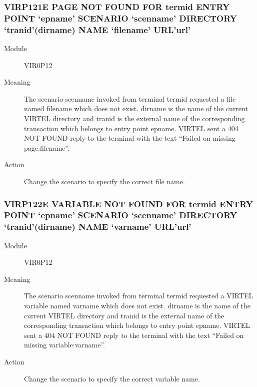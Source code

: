 \documentclass[letterpaper,10pt,english]{sphinxmanual}
\begin{document}
\subsubsection{VIRP121E PAGE NOT FOUND FOR termid ENTRY POINT ‘epname’ SCENARIO ‘scenname’ DIRECTORY ‘tranid’(dirname) NAME ‘filename’ URL’url’}
\label{\detokenize{messages:virp121e-page-not-found-for-termid-entry-point-epname-scenario-scenname-directory-tranid-dirname-name-filename-url-url}}\begin{description}
\item[{Module}] \leavevmode
VIR0P12

\item[{Meaning}] \leavevmode
The scenario scenname invoked from terminal termid requested a file named filename which does not exist. dirname is the name of the current VIRTEL directory and tranid is the external name of the corresponding transaction which belongs to entry point epname. VIRTEL sent a 404 NOT FOUND reply to the terminal with the text “Failed on missing page:filename”.

\item[{Action}] \leavevmode
Change the scenario to specify the correct file name.

\end{description}


\subsubsection{VIRP122E VARIABLE NOT FOUND FOR termid ENTRY POINT ‘epname’ SCENARIO ‘scenname’ DIRECTORY ‘tranid’(dirname) NAME ‘varname’ URL’url’}
\label{\detokenize{messages:virp122e-variable-not-found-for-termid-entry-point-epname-scenario-scenname-directory-tranid-dirname-name-varname-url-url}}\begin{description}
\item[{Module}] \leavevmode
VIR0P12

\item[{Meaning}] \leavevmode
The scenario scenname invoked from terminal termid requested a VIRTEL variable named varname which does not exist. dirname is the name of the current VIRTEL directory and tranid is the external name of the corresponding transaction which belongs to entry point epname. VIRTEL sent a 404 NOT FOUND reply to the terminal with the text “Failed on missing variable:varname”.

\item[{Action}] \leavevmode
Change the scenario to specify the correct variable name.

\end{description}
\end{document}
